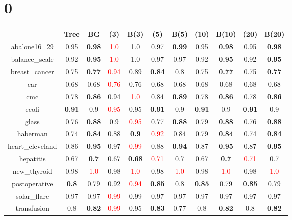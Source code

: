 \documentclass{article}%
\begin{document}
%
\normalsize%
\section*{0}%
\begin{tabular}{c|cccccccccc}%
\hline%
&Tree&BG&(3)&B(3)&(5)&B(5)&(10)&B(10)&(20)&B(20)\\%
\hline%
abalone16\_29&0.95&\textbf{0.98}&\textcolor{red}{ 
1.0
}&1.0&0.97&\textbf{0.99}&0.95&\textbf{0.98}&0.95&\textbf{0.98}\\%
\hline%
balance\_scale&0.92&\textbf{0.95}&\textcolor{red}{ 
1.0
}&1.0&0.97&0.97&0.92&\textbf{0.95}&0.92&\textbf{0.95}\\%
\hline%
breast\_cancer&0.75&\textbf{0.77}&\textcolor{red}{ 
0.94
}&0.89&\textbf{0.84}&0.8&0.75&\textbf{0.77}&0.75&\textbf{0.77}\\%
\hline%
car&0.68&0.68&\textcolor{red}{ 
0.76
}&0.76&0.68&0.68&0.68&0.68&0.68&0.68\\%
\hline%
cmc&0.78&\textbf{0.86}&0.94&\textcolor{red}{ 
1.0
}&0.84&\textbf{0.89}&0.78&\textbf{0.86}&0.78&\textbf{0.86}\\%
\hline%
ecoli&\textbf{0.91}&0.9&\textcolor{red}{ 
0.95
}&0.95&\textbf{0.91}&0.9&\textbf{0.91}&0.9&\textbf{0.91}&0.9\\%
\hline%
glass&0.76&\textbf{0.88}&0.9&\textcolor{red}{ 
0.95
}&0.77&\textbf{0.88}&0.79&\textbf{0.88}&0.76&\textbf{0.88}\\%
\hline%
haberman&0.74&\textbf{0.84}&0.88&\textbf{0.9}&\textcolor{red}{ 
0.92
}&0.84&0.79&\textbf{0.84}&0.74&\textbf{0.84}\\%
\hline%
heart\_cleveland&0.86&\textbf{0.95}&0.97&\textcolor{red}{ 
0.99
}&0.88&\textbf{0.94}&0.87&\textbf{0.95}&0.87&\textbf{0.95}\\%
\hline%
hepatitis&0.67&\textbf{0.7}&0.67&\textbf{0.68}&\textcolor{red}{ 
0.71
}&0.7&0.67&\textbf{0.7}&\textcolor{red}{ 
0.71
}&0.7\\%
\hline%
new\_thyroid&0.98&\textcolor{red}{ 
1.0
}&0.98&\textcolor{red}{ 
1.0
}&0.98&\textcolor{red}{ 
1.0
}&0.98&\textcolor{red}{ 
1.0
}&0.98&\textcolor{red}{ 
1.0
}\\%
\hline%
postoperative&\textbf{0.8}&0.79&0.92&\textcolor{red}{ 
0.94
}&\textbf{0.85}&0.8&\textbf{0.85}&0.79&\textbf{0.85}&0.79\\%
\hline%
solar\_flare&0.97&0.97&\textcolor{red}{ 
0.99
}&0.99&0.97&0.97&0.97&0.97&0.97&0.97\\%
\hline%
transfusion&0.8&\textbf{0.82}&\textcolor{red}{ 
0.99
}&0.95&\textbf{0.83}&0.77&0.8&\textbf{0.82}&0.8&\textbf{0.82}\\%

\end{tabular}
\end{document}
